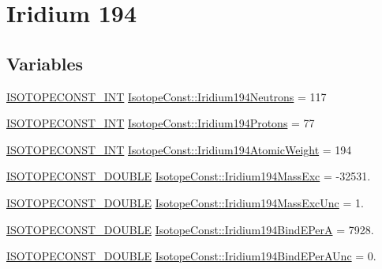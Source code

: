 \hypertarget{group___isotope_const-_iridium-_ir194}{}\section{Iridium 194}
\label{group___isotope_const-_iridium-_ir194}
\subsection*{Variables}
\begin{DoxyCompactItemize}
\item 
\mbox{\hyperlink{group___isotope_const-_macros_ga5f18360b3e99483a35c32d789e62621c}{I\+S\+O\+T\+O\+P\+E\+C\+O\+N\+S\+T\+\_\+\+I\+NT}} \mbox{\hyperlink{group___isotope_const-_iridium-_ir194_ga8d29918e161137df78e0131d48ed4a27}{Isotope\+Const\+::\+Iridium194\+Neutrons}} = 117
\item 
\mbox{\hyperlink{group___isotope_const-_macros_ga5f18360b3e99483a35c32d789e62621c}{I\+S\+O\+T\+O\+P\+E\+C\+O\+N\+S\+T\+\_\+\+I\+NT}} \mbox{\hyperlink{group___isotope_const-_iridium-_ir194_gab30f4a338ec4e7afa442868baee30a0a}{Isotope\+Const\+::\+Iridium194\+Protons}} = 77
\item 
\mbox{\hyperlink{group___isotope_const-_macros_ga5f18360b3e99483a35c32d789e62621c}{I\+S\+O\+T\+O\+P\+E\+C\+O\+N\+S\+T\+\_\+\+I\+NT}} \mbox{\hyperlink{group___isotope_const-_iridium-_ir194_gaae148cd5ffe0af28205e002675c1c9d3}{Isotope\+Const\+::\+Iridium194\+Atomic\+Weight}} = 194
\item 
\mbox{\hyperlink{group___isotope_const-_macros_ga8f45a7272ce02c0b4c65c44636ed719a}{I\+S\+O\+T\+O\+P\+E\+C\+O\+N\+S\+T\+\_\+\+D\+O\+U\+B\+LE}} \mbox{\hyperlink{group___isotope_const-_iridium-_ir194_ga6d10126b94920e9857964588fc1e0fec}{Isotope\+Const\+::\+Iridium194\+Mass\+Exc}} = -\/32531.
\item 
\mbox{\hyperlink{group___isotope_const-_macros_ga8f45a7272ce02c0b4c65c44636ed719a}{I\+S\+O\+T\+O\+P\+E\+C\+O\+N\+S\+T\+\_\+\+D\+O\+U\+B\+LE}} \mbox{\hyperlink{group___isotope_const-_iridium-_ir194_gacea86ff202f49dc9382906ed16911da4}{Isotope\+Const\+::\+Iridium194\+Mass\+Exc\+Unc}} = 1.
\item 
\mbox{\hyperlink{group___isotope_const-_macros_ga8f45a7272ce02c0b4c65c44636ed719a}{I\+S\+O\+T\+O\+P\+E\+C\+O\+N\+S\+T\+\_\+\+D\+O\+U\+B\+LE}} \mbox{\hyperlink{group___isotope_const-_iridium-_ir194_ga6b1d1433016e63d43790202ecfeb76af}{Isotope\+Const\+::\+Iridium194\+Bind\+E\+PerA}} = 7928.
\item 
\mbox{\hyperlink{group___isotope_const-_macros_ga8f45a7272ce02c0b4c65c44636ed719a}{I\+S\+O\+T\+O\+P\+E\+C\+O\+N\+S\+T\+\_\+\+D\+O\+U\+B\+LE}} \mbox{\hyperlink{group___isotope_const-_iridium-_ir194_ga7e3eac3bb0920706e61759f4e42fafeb}{Isotope\+Const\+::\+Iridium194\+Bind\+E\+Per\+A\+Unc}} = 0.

\end{DoxyCompactItemize}
